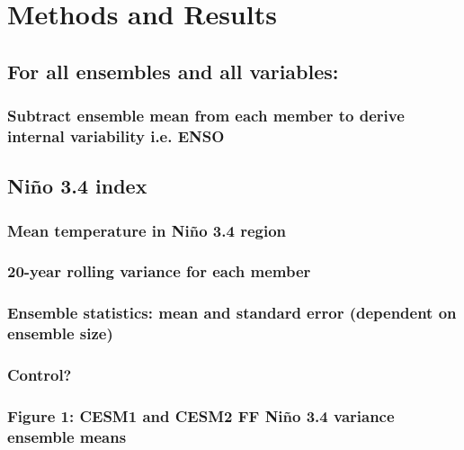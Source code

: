 \documentclass[11pt]{article}
\begin{document}
\section{Methods and Results}
\label{sec:org1eb5e61}
\subsection{For all ensembles and all variables:}
\label{sec:orgc5525b4}
\subsubsection{Subtract ensemble mean from each member to derive internal variability i.e. ENSO}
\label{sec:orgba6e56a}
\subsection{Niño 3.4 index}
\label{sec:orgf22a460}
\subsubsection{Mean temperature in Niño 3.4 region}
\label{sec:org7245a90}
\subsubsection{20-year rolling variance for each member}
\label{sec:org084d966}
\subsubsection{Ensemble statistics: mean and standard error (dependent on ensemble size)}
\label{sec:orgdf5efb6}
\subsubsection{Control?}
\label{sec:orgb67f98a}
\subsubsection{Figure 1: CESM1 and CESM2 FF Niño 3.4 variance ensemble means}
\label{sec:orgdb13ad6}
\end{document}
